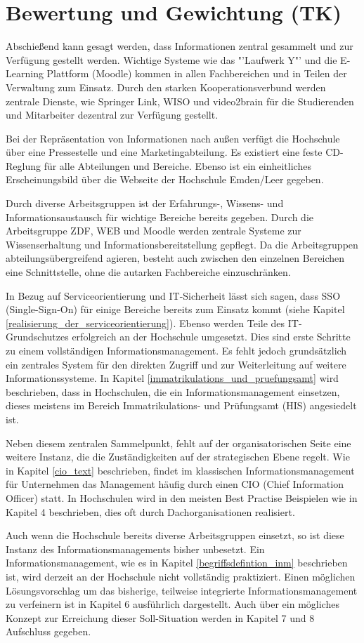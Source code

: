 \section{Bewertung und Gewichtung (TK)}

Abschießend kann gesagt werden, dass Informationen zentral gesammelt und zur Verfügung gestellt werden. 
Wichtige Systeme wie das "'Laufwerk Y"' und die E-Learning Plattform (Moodle) kommen in allen 
Fachbereichen und in Teilen der Verwaltung zum Einsatz. Durch den starken Kooperationsverbund werden 
zentrale Dienste, wie Springer Link, WISO und video2brain für die Studierenden und Mitarbeiter dezentral zur 
Verfügung gestellt. 

Bei der Repräsentation von Informationen nach außen verfügt die Hochschule über eine Pressestelle und eine 
Marketingabteilung. Es existiert eine feste CD-Reglung für alle Abteilungen und Bereiche. Ebenso ist ein 
einheitliches Erscheinungsbild über die Webseite der Hochschule Emden/Leer gegeben.

Durch diverse Arbeitsgruppen ist der Erfahrungs-, Wissens- und Informationsaustausch für wichtige Bereiche 
bereits gegeben. Durch die Arbeitsgruppe ZDF, WEB und Moodle werden zentrale Systeme zur 
Wissenserhaltung und Informationsbereitstellung gepflegt. Da die Arbeitsgruppen abteilungsübergreifend 
agieren, besteht auch zwischen den einzelnen Bereichen eine Schnittstelle, ohne die autarken Fachbereiche 
einzuschränken. 

In Bezug auf Serviceorientierung und IT-Sicherheit lässt sich sagen, dass SSO (Single-Sign-On) für einige 
Bereiche bereits zum Einsatz kommt (siehe Kapitel \ref{realisierung_der_serviceorientierung}). Ebenso werden 
Teile des IT-Grundschutzes erfolgreich an der Hochschule umgesetzt. Dies sind erste Schritte zu einem 
vollständigen Informationsmanagement. Es fehlt jedoch grundsätzlich ein zentrales System für den direkten 
Zugriff und zur Weiterleitung auf weitere Informationssysteme. In Kapitel 
\ref{immatrikulations_und_pruefungsamt} wird beschrieben, dass in Hochschulen, die ein 
Informationsmanagement einsetzen, dieses meistens im Bereich Immatrikulations- und Prüfungsamt (HIS) 
angesiedelt ist. 

Neben diesem zentralen Sammelpunkt, fehlt auf der organisatorischen Seite eine weitere Instanz, die die 
Zuständigkeiten auf der strategischen Ebene regelt. Wie in Kapitel \ref{cio_text} beschrieben, findet im 
klassischen Informationsmanagement für Unternehmen das Management häufig durch einen CIO (Chief 
Information Officer) statt. In Hochschulen wird in den meisten Best Practise Beispielen wie in Kapitel 4 
beschrieben, dies oft durch Dachorganisationen realisiert.

Auch wenn die Hochschule bereits diverse Arbeitsgruppen einsetzt, so ist diese Instanz des 
Informationsmanagements bisher unbesetzt. Ein Informationsmanagement, wie es in Kapitel 
\ref{begriffsdefintion_inm} beschrieben ist, wird derzeit an der Hochschule nicht vollständig praktiziert. Einen 
möglichen Lösungsvorschlag um das bisherige, teilweise integrierte Informationsmanagement zu verfeinern 
ist in Kapitel 6 ausführlich dargestellt. Auch über ein mögliches Konzept zur Erreichung dieser Soll-Situation 
werden in Kapitel 7 und 8 Aufschluss gegeben.